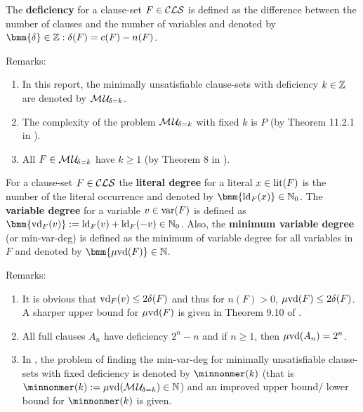 \documentclass{report}
\begin{document}
\begin{defi}\label{def:deficiency}
The \textbf{deficiency} for a clause-set $F \in \mathcal{CLS}$ is defined as the difference between the number of clauses and the number of variables and denoted by $\bmm{\delta} \in \ZZ: \delta(F)= c(F) - n(F)$.
\end{defi}
Remarks:
  \begin{enumerate}
  \item In this report, the minimally unsatisfiable clause-sets with deficiency $k \in \mathbb{Z}$ are denoted by $\mathcal{M\hspace{0.8pt}U}_{\!\delta=k}$.
  \item The complexity of the problem $\mathcal{M\hspace{0.8pt}U}_{\!\delta=k}$ with fixed $k$ is $P$ (by Theorem 11.2.1 in \cite{Kullmann2007HandbuchMU}).
  \item All $F \in \mathcal{M\hspace{0.8pt}U}_{\!\delta=k}$ have $k \ge 1$ (by Theorem 8 in \cite{DDK98}).
  \end{enumerate}

\begin{defi}\label{def:degree}
For a clause-set $F \in \mathcal{CLS}$ the \textbf{literal degree} for a literal $x \in \operatorname{lit}(F)$ is the number of the literal occurrence and denoted by $\bmm{\ldeg_F(x)} \in \NNZ$. The \textbf{variable degree} for a variable $v \in \operatorname{var}(F)$ is defined as $\bmm{\vdeg_F(v)} := \ldeg_F(v) + \ldeg_F(-v) \in \NNZ$. Also, the \textbf{minimum variable degree} (or min-var-deg) is defined as the minimum of variable degree for all variables in $F$ and denoted by $\bmm{\minvdeg(F)} \in \NN$.
\end{defi}
Remarks:
  \begin{enumerate}
  \item It is obvious that $\operatorname{vd}_F(v) \le 2 \delta(F)$ and thus for $n(F) >0$, $\operatorname{\mu\!\operatorname{vd}}(F) \le 2 \delta(F)$. A sharper upper bound for $\operatorname{\mu\!\operatorname{vd}}(F)$ is given in Theorem 9.10 of \cite{KullmannZhao2010Extremal}.
  \item All full clauses $A_n$ have deficiency $2^n - n$ and if $n \ge 1$, then  $\operatorname{\mu\!\operatorname{vd}}(A_n) =2^n$.
  \item In \cite{KullmannZhao2010Extremal}, the problem of finding the min-var-deg for minimally unsatisfiable clause-sets with fixed deficiency is denoted by $\minnonmer(k) $ (that is $\minnonmer(k)  :=  \minvdeg(\Musati{\delta=k}) \in \NN$) and an improved upper bound/ lower bound for $\minnonmer(k) $ is given.
    \end{enumerate}
    
\end{document}
